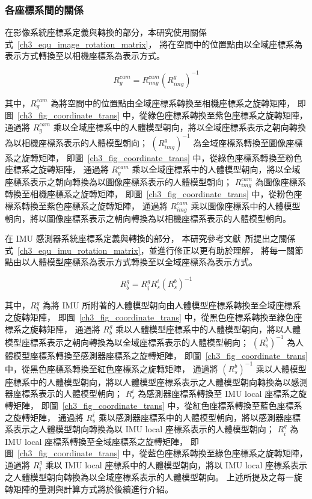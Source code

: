 \clearpage

\subsubsection{各座標系間的關係}
在影像系統座標系定義與轉換的部分，本研究使用關係式~\ref{ch3_equ_image_rotation_matrix}，
將在空間中的位置點由以全域座標系為表示方式轉換至以相機座標系為表示方式。

\begin{equation}
   R^{cam}_{g} = R^{cam}_{img}(R^{g}_{img})^{-1}
   \label{ch3_equ_image_rotation_matrix}
\end{equation}

其中，$R^{cam}_g$ 為將空間中的位置點由全域座標系轉換至相機座標系之旋轉矩陣，
即圖~\ref{ch3_fig_coordinate_trans} 中，從綠色座標系轉換至紫色座標系之旋轉矩陣，
通過將 $R^{cam}_g$ 乘以全域座標系中的人體模型朝向，將以全域座標系表示之朝向轉換為以相機座標系表示的人體模型朝向；
$(R^{g}_{img})^{-1}$ 為全域座標系轉換至圖像座標系之旋轉矩陣，
即圖~\ref{ch3_fig_coordinate_trans} 中，從綠色座標系轉換至粉色座標系之旋轉矩陣，
通過將 $R^{cam}_g$ 乘以全域座標系中的人體模型朝向，將以全域座標系表示之朝向轉換為以圖像座標系表示的人體模型朝向；
$R^{cam}_{img}$ 為圖像座標系轉換至相機座標系之旋轉矩陣，
即圖~\ref{ch3_fig_coordinate_trans} 中，從粉色座標系轉換至紫色座標系之旋轉矩陣，
通過將 $R^{cam}_{img}$ 乘以圖像座標系中的人體模型朝向，將以圖像座標系表示之朝向轉換為以相機座標系表示的人體模型朝向。

在 IMU 感測器系統座標系定義與轉換的部分，
本研究參考文獻~\cite{malleson2017real}所提出之關係式~\ref{ch3_equ_imu_rotation_matrix}，並進行修正以更有助於理解，
將每一關節點由以人體模型座標系為表示方式轉換至以全域座標系為表示方式。

\begin{equation}
   R^g_b=R^g_iR^i_s(R^b_s)^{-1}
   \label{ch3_equ_imu_rotation_matrix}
\end{equation}

其中，$R^g_b$ 為將 IMU 所附著的人體模型朝向由人體模型座標系轉換至全域座標系之旋轉矩陣，
即圖~\ref{ch3_fig_coordinate_trans} 中，從黑色座標系轉換至綠色座標系之旋轉矩陣，
通過將 $R^g_b$ 乘以人體模型座標系中的人體模型朝向，將以人體模型座標系表示之朝向轉換為以全域座標系表示的人體模型朝向；
$(R^b_s)^{-1}$ 為人體模型座標系轉換至感測器座標系之旋轉矩陣，
即圖~\ref{ch3_fig_coordinate_trans} 中，從黑色座標系轉換至紅色座標系之旋轉矩陣，
通過將 $(R^b_s)^{-1}$ 乘以人體模型座標系中的人體模型朝向，將以人體模型座標系表示之人體模型朝向轉換為以感測器座標系表示的人體模型朝向；
$R^i_s$ 為感測器座標系轉換至 IMU local 座標系之旋轉矩陣，
即圖~\ref{ch3_fig_coordinate_trans} 中，從紅色座標系轉換至藍色座標系之旋轉矩陣，
通過將 $R^i_s$ 乘以感測器座標系中的人體模型朝向，將以感測器座標系表示之人體模型朝向轉換為以 IMU local 座標系表示的人體模型朝向；
$R^g_i$ 為 IMU local 座標系轉換至全域座標系之旋轉矩陣，
即圖~\ref{ch3_fig_coordinate_trans} 中，從藍色座標系轉換至綠色座標系之旋轉矩陣，
通過將 $R^g_i$ 乘以 IMU local 座標系中的人體模型朝向，將以 IMU local 座標系表示之人體模型朝向轉換為以全域座標系表示的人體模型朝向。
上述所提及之每一旋轉矩陣的量測與計算方式將於後續進行介紹。

